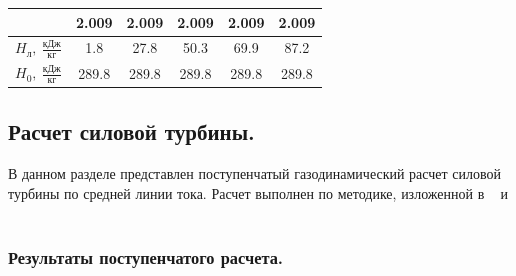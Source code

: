 \documentclass[a4paper,12pt]{article}
\begin{document}
\begin{longtable}{
    |
%    
    c|
%    
    c|
%    
    c|
%    
    c|
%    
    c|
%    
    c|
%    
    }
%        
        & 2.009
%        
        & 2.009
%        
        & 2.009
%        
        & 2.009
%        
        & 2.009
%        
        \\
        \hline
%        
        $H_л,\ \frac{кДж}{кг}$
%        
        & 1.8
%        
        & 27.8
%        
        & 50.3
%        
        & 69.9
%        
        & 87.2
%        
        \\
        \hline
%        
        $H_0,\ \frac{кДж}{кг}$
%        
        & 289.8
%        
        & 289.8
%        
        & 289.8
%        
        & 289.8
%        
        & 289.8
%        
        \\
        \hline
%        

    \end{longtable}

%        

    \subsection{Расчет силовой турбины.}
    В данном разделе представлен поступенчатый газодинамический расчет силовой турбины по средней линии тока.
    Расчет выполнен по методике, изложенной в ~\cite{molyakov1} и ~\cite{molyakov2}
    \subsubsection{Результаты поступенчатого расчета.}
%    
\end{document}
